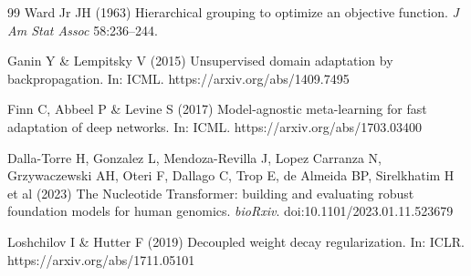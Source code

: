 \documentclass[12pt]{article}
\begin{document}
\begin{singlespacing}
\begin{thebibliography}{99}
Ward Jr JH (1963) Hierarchical grouping to optimize an objective function. \textit{J Am Stat Assoc} 58:236--244.

Ganin Y \& Lempitsky V (2015) Unsupervised domain adaptation by backpropagation. In: ICML. https://arxiv.org/abs/1409.7495

Finn C, Abbeel P \& Levine S (2017) Model-agnostic meta-learning for fast adaptation of deep networks. In: ICML. https://arxiv.org/abs/1703.03400

Dalla-Torre H, Gonzalez L, Mendoza-Revilla J, Lopez Carranza N, Grzywaczewski AH, Oteri F, Dallago C, Trop E, de Almeida BP, Sirelkhatim H et al (2023) The Nucleotide Transformer: building and evaluating robust foundation models for human genomics. \textit{bioRxiv}. doi:10.1101/2023.01.11.523679

Loshchilov I \& Hutter F (2019) Decoupled weight decay regularization. In: ICLR. https://arxiv.org/abs/1711.05101







\end{thebibliography}
\end{singlespacing}
\end{document}
